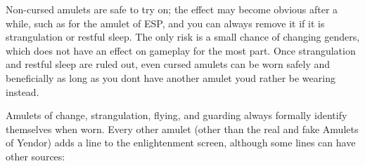 Non-{}cursed amulets are safe to try on; the effect may become obvious after a while, such as for the amulet of ESP, and you can always remove it if it is strangulation or restful sleep. The only risk is a small chance of changing genders, which does not have an effect on gameplay for the most part. Once strangulation and restful sleep are ruled out, even cursed amulets can be worn safely and beneficially as long as you don\textquotesingle{}t have another amulet you\textquotesingle{}d rather be wearing instead.


Amulets of change, strangulation, flying, and guarding always formally identify themselves when worn.  Every other amulet (other than the real and fake Amulets of Yendor) adds a line to the enlightenment\footnotemark[67] screen, although some lines can have other sources:




